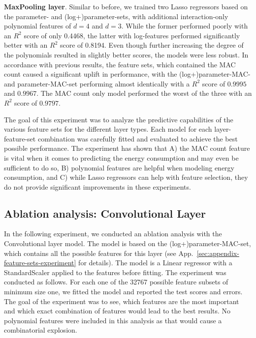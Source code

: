 \textbf{MaxPooling layer}. Similar to before, we trained two Lasso regressors based on the parameter- and (log+)parameter-sets, with additional interaction-only polynomial features of $d=4$ and $d=3$. While the former performed poorly with an $R^2$ score of only 0.4468, the latter with log-features performed significantly better with an $R^2$ score of 0.8194. Even though further increasing the degree of the polynomials resulted in slightly better scores, the models were less robust. In accordance with previous results, the feature sets, which contained the MAC count caused a significant uplift in performance, with the (log+)parameter-MAC- and parameter-MAC-set performing almost identically with a $R^2$ score of $0.9995$ and $0.9967$. The MAC count only model performed the worst of the three with an $R^2$ score of $0.9797$.

The goal of this experiment was to analyze the predictive capabilities of the various feature sets for the different layer types. Each model for each layer-feature-set combination was carefully fitted and evaluated to achieve the best possible performance. The experiment has shown that A) the MAC count feature is vital when it comes to predicting the energy consumption and may even be sufficient to do so, B) polynomial features are helpful when modeling energy consumption, and C) while Lasso regressors can help with feature selection, they do not provide significant improvements in these experiments.
%
\subsection{Ablation analysis: Convolutional Layer}
\label{sec:appendix-ablation-analysis}
In the following experiment, we conducted an ablation analysis with the Convolutional layer model. The model is based on the (log+)parameter-MAC-set, which contains all the possible features for this layer (see App.~\ref{sec:appendix-feature-sets-experiment} for details). The model is a Linear regressor with a StandardScaler applied to the features before fitting. The experiment was conducted as follows. For each one of the 32767 possible feature subsets of minimum size one, we fitted the model and reported the test scores and errors. The goal of the experiment was to see, which features are the most important and which exact combination of features would lead to the best results. No polynomial features were included in this analysis as that would cause a combinatorial explosion.

